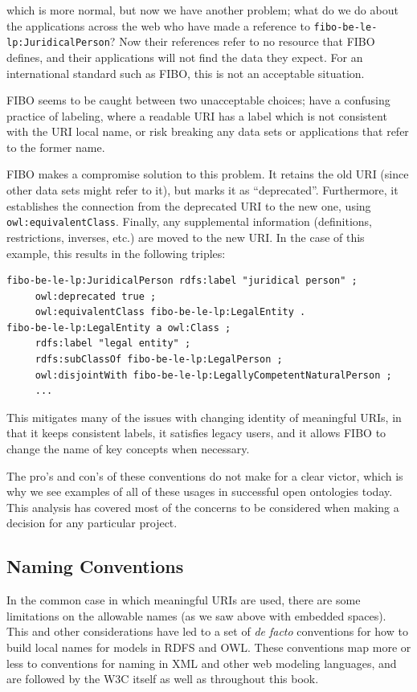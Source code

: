 which is more normal, but now we have another problem; what do we do about the applications
across the web who have made a reference to \texttt{fibo-be-le-lp:JuridicalPerson}?  
Now their references refer to no resource that FIBO defines, and their applications
will not find the data they expect.  For an international standard such as FIBO, this
is not an acceptable situation. 

FIBO seems to be caught between two unacceptable choices; have a confusing
practice of labeling, where a readable URI has a label which is not consistent
with the URI local name, or risk breaking any data sets or applications that refer to 
the former name.  

FIBO makes a compromise solution to this problem.  It retains the old URI (since 
other data sets might refer to it), but marks it as ``deprecated''.  Furthermore, it 
establishes the connection from the deprecated URI to the new one, 
using \texttt{owl:equivalentClass}.  Finally, any supplemental information
(definitions, restrictions, inverses, etc.) are moved to the new URI.  In the case of 
this example, this results in the following triples: 

\begin{lstlisting}
fibo-be-le-lp:JuridicalPerson rdfs:label "juridical person" ;
     owl:deprecated true ;
     owl:equivalentClass fibo-be-le-lp:LegalEntity .
fibo-be-le-lp:LegalEntity a owl:Class ;
     rdfs:label "legal entity" ;
     rdfs:subClassOf fibo-be-le-lp:LegalPerson ;
     owl:disjointWith fibo-be-le-lp:LegallyCompetentNaturalPerson ;
     ...
\end{lstlisting}


This mitigates many of the issues with changing identity of meaningful URIs, in that 
it keeps consistent labels, it satisfies legacy users, and it allows FIBO to 
change the name of key concepts when necessary.  

The pro's and con's of these conventions do not make for a clear victor, which is 
why we see examples of all of these usages in successful open ontologies today.  
This analysis has covered most of the concerns to be considered when making a
decision for any particular project. 

\subsection{Naming Conventions}

In the common case in which meaningful URIs are used, there are some limitations
on the allowable names (as we saw above with embedded spaces).  This and other 
considerations have led to a set of \emph{de facto} conventions for how to build
local names for models in RDFS and OWL.  These conventions map more or less to conventions
for naming in XML and other web modeling languages, and are followed by the W3C
itself as well as throughout this book.


